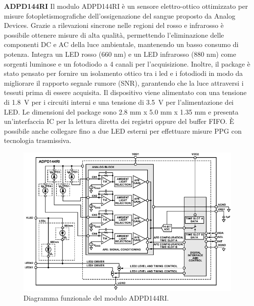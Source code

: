 \textbf{ADPD144RI} Il modulo ADPD144RI è un sensore elettro-ottico ottimizzato per misure fotopletismografiche dell'ossigenazione del sangue proposto da Analog Devices\cite{AnalogDevicesADPD144RI}. Grazie a rilevazioni sincrone nelle regioni del rosso e infrarosso è possibile ottenere misure di alta qualità, permettendo l'eliminazione delle componenti DC e AC della luce ambientale, mantenendo un basso consumo di potenza. Integra un LED rosso (660 nm) e un LED infrarosso (880 nm) come sorgenti luminose e un fotodiodo a 4 canali per l'acquisizione. Inoltre, il package è stato pensato per fornire un isolamento ottico tra i led e i fotodiodi in modo da migliorare il rapporto segnale rumore (SNR), garantendo che la luce attraversi i tessuti prima di essere acquisita. Il dispositivo viene alimentato con una tensione di \SI{1.8}{\volt} per i circuiti interni e una tensione di \SI{3.5}{\volt} per l'alimentazione dei LED. Le dimensioni del package sono 2.8 mm x 5.0 mm x 1.35 mm e presenta un'interfaccia IC per la lettura diretta dei registri oppure del buffer FIFO. \`E possibile anche collegare fino a due LED esterni per effettuare misure PPG con tecnologia trasmissiva.
\begin{figure}[b]
	\centering
	\includegraphics[width=0.8\linewidth]{ImageFiles/Fotopletismografia/ADPD144RIBlockDiagram}
	\caption{Diagramma funzionale del modulo ADPD144RI.}
	\label{fig:ADPD144RIBlockDiagram}
\end{figure}
\pagebreak

